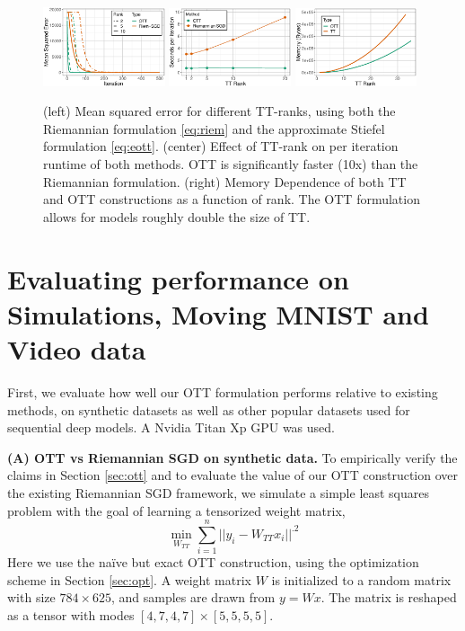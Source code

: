 \begin{figure}[h]
	\centering
	\includegraphics[width=0.32\textwidth]{4_ott/figs/sim/rank_convergence.eps}
	\includegraphics[width=0.32\textwidth]{4_ott/figs/sim/time_comparison.eps}
        \includegraphics[width=0.32\textwidth]{4_ott/figs/sim/mem_vs_rank.eps}
        \vspace{-13pt}
	\caption{\label{fig:riemstief} \footnotesize (left) Mean squared error for different TT-ranks,
          using both the Riemannian formulation \eqref{eq:riem} and the approximate Stiefel formulation \eqref{eq:eott}.
          (center) Effect of TT-rank on per iteration runtime of both methods. OTT is significantly faster (10x)
          than the Riemannian formulation.
          (right) Memory Dependence of both TT and OTT constructions as a function of rank.
          The OTT formulation allows for models roughly double the size of TT.}
\end{figure}

\section{Evaluating performance on Simulations, Moving MNIST and Video data}\label{sec:exps}
First,
we evaluate how well our OTT formulation performs relative to existing methods, on synthetic
datasets as well as other popular datasets used for sequential deep models. 
A Nvidia Titan Xp GPU was used. 

\textbf{(A) OTT vs Riemannian SGD on synthetic data.}
To empirically verify the claims in Section \ref{sec:ott}
and to evaluate the value of our OTT construction over the existing Riemannian SGD framework,
we simulate a simple least squares problem with the goal of learning a tensorized weight matrix,
$$\min_{W_{TT}} \sum_{i=1}^n ||y_i - W_{TT}x_i||^.2$$
Here we use the na\"ive but exact OTT construction,
using the optimization scheme in Section \ref{sec:opt}.
A weight matrix $W$ is initialized to a random matrix with size $784 \times 625$, and samples are drawn from $y=Wx$. The matrix is reshaped as a tensor with modes $[4,7,4,7] \times [5,5,5,5]$.

